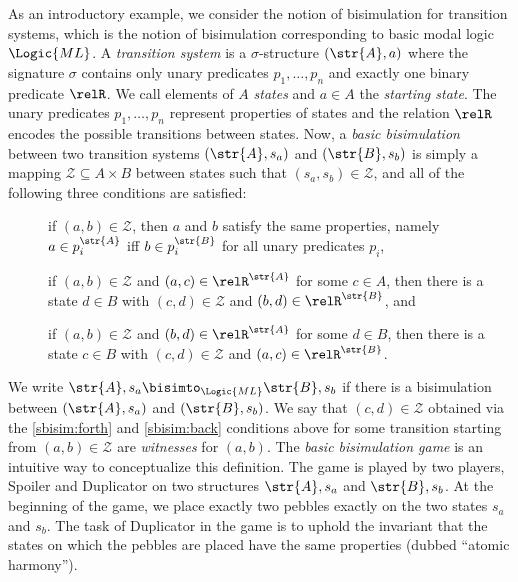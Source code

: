As an introductory example, we consider the notion of bisimulation for transition systems, which is the notion of bisimulation corresponding to basic modal logic $\Logic{ML}$.
A \emph{transition system} is a $\sigma$-structure $(\str{A}, a)$ where the signature $\sigma$ contains only unary predicates $p_{1}, \ldots, p_{n}$ and exactly one binary predicate $\relR$.
We call elements of $A$ \emph{states} and $a \in A$ the \emph{starting state}.
The unary predicates $p_{1}, \ldots, p_{n}$ represent properties of states and the relation $\relR$ encodes the possible transitions between states.
Now, a \emph{basic bisimulation} between two transition systems $(\str{A},s_{a})$ and $(\str{B},s_{b})$ is simply a mapping $\mathcal{Z} \subseteq A \times B$ between states such that $(s_{a}, s_{b}) \in \mathcal{Z}$,  and all of the following three conditions are satisfied:
\begin{description}
  \item[] if $(a,b) \in \mathcal{Z}$, then $a$ and $b$ satisfy the same properties, namely $a \in p_{i}^{\str{A}}$ iff $b \in p_{i}^{\str{B}}$ for all unary predicates $p_{i}$,
  \item[] if $(a,b) \in \mathcal{Z}$ and $(a,c) \in \relR^{\str{A}}$ for some $c \in A$, then there is a state $d \in B$ with $(c,d) \in \mathcal{Z}$ and $(b,d) \in \relR^{\str{B}}$, and
  \item[] if $(a,b) \in \mathcal{Z}$ and $(b,d) \in \relR^{\str{A}}$ for some $d \in B$, then there is a state $c \in B$ with $(c,d) \in \mathcal{Z}$ and $(a,c) \in \relR^{\str{B}}$.
\end{description}
We write $\str{A}, s_{a} \bisimto_{\Logic{ML}} \str{B}, s_{b}$ if there is a bisimulation between $(\str{A}, s_{a})$ and $(\str{B}, s_{b})$.
We say that $(c,d) \in \mathcal{Z}$ obtained via the \ref{sbisim:forth} and \ref{sbisim:back} conditions above for some transition starting from $(a,b) \in \mathcal{Z}$ are \emph{witnesses} for $(a,b)$.
The \emph{basic bisimulation game} is an intuitive way to conceptualize this definition.
The game is played by two players, Spoiler and Duplicator on two structures $\str{A}, s_{a}$ and $\str{B}, s_{b}$.
At the beginning of the game, we place exactly two pebbles exactly on the two states $s_{a}$ and $s_{b}$.
The task of Duplicator in the game is to uphold the invariant that the states on which the pebbles are placed have the same properties (dubbed ``atomic harmony'').
